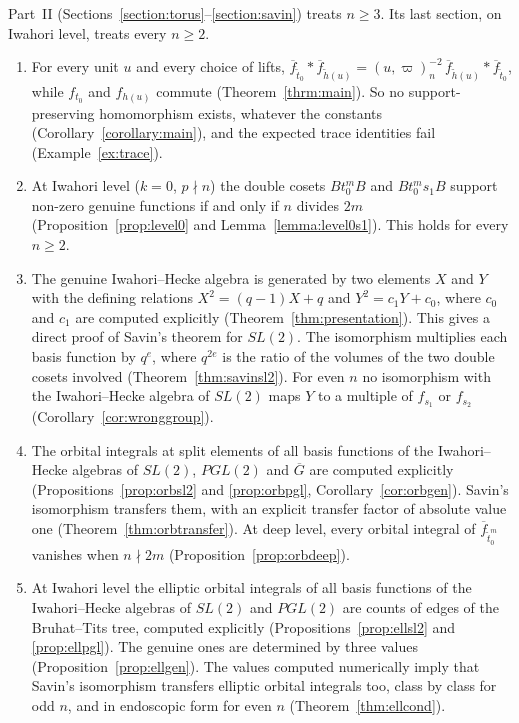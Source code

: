 \documentclass[12pt,letterpaper]{amsart}
\numberwithin{equation}{section}
\theoremstyle{definition}
\theoremstyle{remark}
\newcommand{\Gbar}{\overline{G}}
\newcommand{\fbar}{\overline{f}}
\begin{document}
\noindent
Part~II (Sections~\ref{section:torus}--\ref{section:savin}) treats
$n\geq 3$. Its last section, on Iwahori level, treats every $n\geq 2$.
\begin{enumerate}[leftmargin=2em,resume]
\item For every unit $u$ and every choice of lifts,
$\fbar_{\tilde t_0}*\fbar_{\tilde h(u)}=(u,\varpi)_n^{-2}\,
\fbar_{\tilde h(u)}*\fbar_{\tilde t_0}$, while $f_{t_0}$ and
$f_{h(u)}$ commute (Theorem~\ref{thrm:main}). So no support-preserving
homomorphism exists, whatever the constants
(Corollary~\ref{corollary:main}), and the expected trace identities
fail (Example~\ref{ex:trace}).
\item At Iwahori level ($k=0$, $p\nmid n$) the double cosets $Bt_0^mB$
and $Bt_0^ms_1B$ support non-zero genuine functions if and only if $n$
divides $2m$ (Proposition~\ref{prop:level0} and
Lemma~\ref{lemma:level0s1}). This holds for every $n\geq 2$.
\item The genuine Iwahori--Hecke algebra is generated by two elements
$X$ and $Y$ with the defining relations $X^2=(q-1)X+q$ and
$Y^2=c_1Y+c_0$, where $c_0$ and $c_1$ are computed explicitly
(Theorem~\ref{thm:presentation}). This gives a direct proof of Savin's
theorem \cite{Sa88} for $SL(2)$. The isomorphism multiplies each basis
function by $q^{e}$, where $q^{2e}$ is the ratio of the volumes of the
two double cosets involved (Theorem~\ref{thm:savinsl2}). For even $n$
no isomorphism with the Iwahori--Hecke algebra of $SL(2)$ maps $Y$ to a
multiple of $f_{s_1}$ or $f_{s_2}$ (Corollary~\ref{cor:wronggroup}).
\item The orbital integrals at split elements of all basis functions of
the Iwahori--Hecke algebras of $SL(2)$, $PGL(2)$ and $\Gbar$ are
computed explicitly (Propositions~\ref{prop:orbsl2} and
\ref{prop:orbpgl}, Corollary~\ref{cor:orbgen}). Savin's isomorphism
transfers them, with an explicit transfer factor of absolute value one
(Theorem~\ref{thm:orbtransfer}). At deep level, every orbital integral
of $\fbar_{\tilde t_0^m}$ vanishes when $n\nmid 2m$
(Proposition~\ref{prop:orbdeep}).
\item At Iwahori level the elliptic orbital integrals of all basis
functions of the Iwahori--Hecke algebras of $SL(2)$ and $PGL(2)$ are
counts of edges of the Bruhat--Tits tree, computed explicitly
(Propositions~\ref{prop:ellsl2} and \ref{prop:ellpgl}). The genuine ones
are determined by three values (Proposition~\ref{prop:ellgen}). The
values computed numerically imply that Savin's isomorphism transfers
elliptic orbital integrals too, class by class for odd $n$, and in
endoscopic form for even $n$ (Theorem~\ref{thm:ellcond}).
\end{enumerate}
\end{document}
